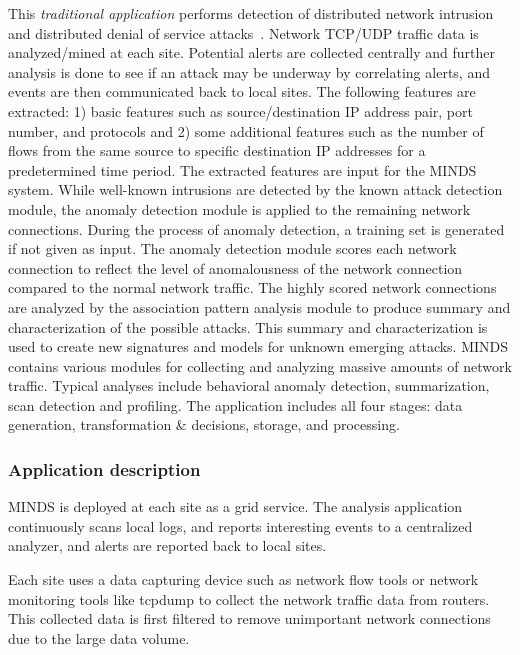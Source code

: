 
This {\em traditional application} performs detection of distributed network intrusion and distributed denial of service attacks~\cite{jon}.  Network TCP/UDP
traffic data is analyzed/mined at each site. Potential alerts are collected centrally and further
analysis is done to see if an attack may be underway by correlating alerts, and events are then
communicated back to local sites. The following features are extracted: 1) basic features such as
source/destination IP address pair, port number, and protocols and 2) some additional features
such as the number of flows from the same source to specific destination IP addresses for a
predetermined time period. The extracted features are input for the MINDS system. While well-known
intrusions are detected by the known attack detection module, the anomaly detection module is
applied to the remaining network connections. During the process of anomaly detection, a training
set is generated if not given as input. The anomaly detection module scores each network
connection to reflect the level of anomalousness of the network connection compared to the normal
network traffic. The highly scored network connections are analyzed by the association pattern
analysis module to produce summary and characterization of the possible attacks. This summary
and characterization is used to create new signatures and models for unknown emerging attacks.
MINDS contains various modules for collecting and analyzing massive amounts of network traffic.
Typical analyses include behavioral anomaly detection, summarization, scan detection and
profiling.  The application includes all four stages: data generation, transformation \& decisions, storage, and processing.

\subsubsection*{Application description}


MINDS is deployed at each site as a grid service. The analysis application continuously scans local logs, and reports interesting events to a centralized analyzer, and alerts are reported back to local sites.

Each site uses a data capturing device such as network flow tools or network monitoring tools like tcpdump  to collect the network traffic data from routers.  This collected data is first filtered to remove unimportant network connections due to the large data volume.

